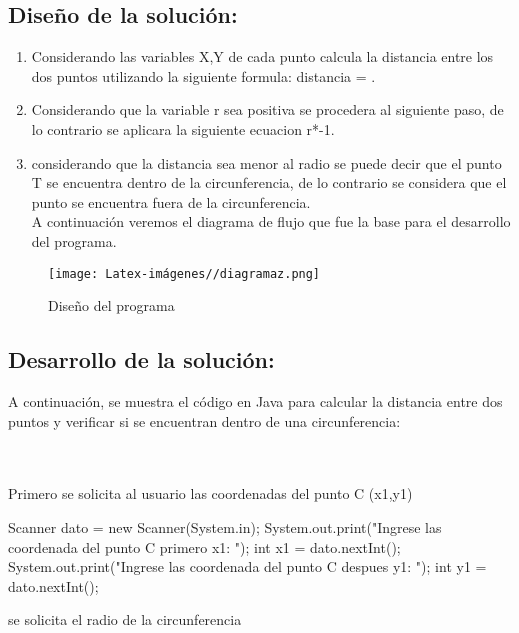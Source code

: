 \subsection{\textbf{Diseño de la solución:}}
\begin{enumerate}[label=\textbf{\arabic*.}]

  \item Considerando las variables X,Y de cada punto calcula la distancia entre los dos puntos utilizando la siguiente formula: {distancia} = .

  \item  Considerando que la variable r sea positiva se procedera al siguiente paso, de lo contrario se aplicara la siguiente ecuacion r*-1.
  \item considerando que la distancia sea menor al radio se puede decir que el punto T se encuentra dentro de la circunferencia, de lo contrario se considera que el punto se encuentra fuera de la circunferencia. 
  \\
  A continuación veremos el diagrama de flujo que fue la base para el desarrollo del programa.
\end{enumerate}
\begin{figure}[H]
    \centering
    \texttt{[image: Latex-imágenes//diagramaz.png]}
    \caption{Diseño del programa}
    \label{fig:imagen7}
\end{figure}


\subsection{\textbf{Desarrollo de la solución:}}
A continuación, se muestra el código en Java para calcular la distancia entre dos puntos y verificar si se encuentran dentro de una circunferencia:


  \\
  \\
  
        Primero se solicita al usuario las coordenadas del punto C (x1,y1)
       \begin{javaCode}
        Scanner dato = new Scanner(System.in);
        System.out.print("Ingrese las coordenada del punto C primero x1: ");
        int x1 = dato.nextInt();
        System.out.print("Ingrese las coordenada del punto C despues  y1: ");
        int y1 = dato.nextInt();
         \end{javaCode}
         se solicita el radio de la circunferencia
       

